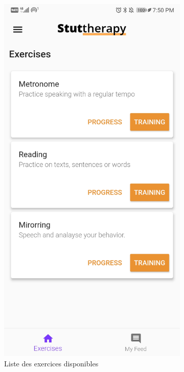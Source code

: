 \begin{appendices}
\begin{landscape}
\begin{figure}[h]
\begin{subfigure}{.25\textwidth}
    \includegraphics[width=.75\linewidth]{content/imgs/screen2.jpg}
    \caption{Liste des exercices disponibles}
    \label{appendix:screen_exercises}
  \end{subfigure}%
  \begin{subfigure}{.25\textwidth}
    \centering

\end{subfigure}
\end{figure}
\end{landscape}
\end{appendices}
